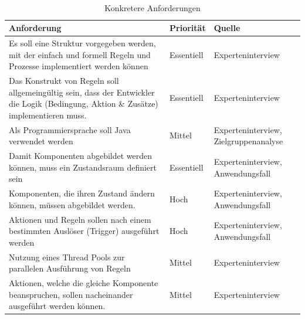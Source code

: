     \\
    \begin{table}[hbt!]
        \begin{center}
            \begin{tabular}{| p{10.4cm} | p{2.0cm} | p{3.0cm} | }
                \hline
                   \textbf{Anforderung} & \textbf{Priorität} & \textbf{Quelle} \\
                \hline
                    Es soll eine Struktur vorgegeben werden, mit der einfach und formell Regeln und Prozesse implementiert werden können & Essentiell & Experteninterview \\ 
                \hline
                    Das Konstrukt von Regeln soll allgemeingültig sein, dass der Entwickler die Logik (Bedingung, Aktion \& Zusätze) implementieren muss. & Essentiell & Experteninterview \\
                \hline
                    Als Programmiersprache soll Java verwendet werden & Mittel & Experteninterview, Zielgruppenanalyse \\ 
                \hline
                    Damit Komponenten abgebildet werden können, muss ein Zustandsraum definiert sein & Essentiell & Experteninterview, Anwendungsfall \\ 
                \hline
                    Komponenten, die ihren Zustand ändern können, müssen abgebildet werden. & Hoch & Experteninterview, Anwendungsfall \\ 
                \hline
                    Aktionen und Regeln sollen nach einem bestimmten Auslöser (Trigger) ausgeführt werden & Hoch & Experteninterview, Anwendungsfall \\
                \hline
                    Nutzung eines Thread Pools zur parallelen Ausführung von Regeln & Mittel & Experteninterview \\ 
                \hline
                    Aktionen, welche die gleiche Komponente beanspruchen, sollen nacheinander ausgeführt werden können. & Mittel & Experteninterview \\
                \hline
            \end{tabular}
        \end{center}
        \caption{Konkretere Anforderungen}
        \label{tab:concretRequirements}
    \end{table}

